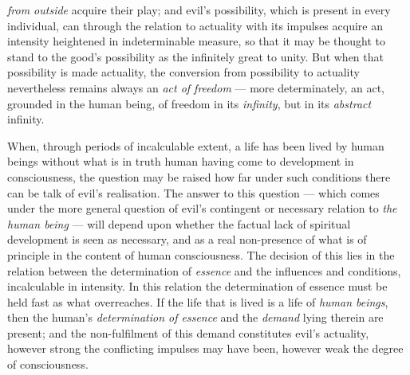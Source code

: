 \documentclass[12pt,a4paper]{book}
\begin{document}
\emph{from outside} acquire their play; and evil's possibility, which is present
in every individual, can through the relation to actuality with its impulses
acquire an intensity heightened in indeterminable measure, so that it may be
thought to stand to the good's possibility as the infinitely
great to unity. But when that possibility is made actuality, the conversion from
possibility to actuality nevertheless remains always an \emph{act of freedom} ---
more determinately, an act, grounded in the human being, of freedom in its
\emph{infinity}, but in its \emph{abstract} infinity.

When, through periods of incalculable extent, a life has been lived by human
beings without what is in truth human having come to development in
consciousness, the question may be raised how far under such conditions there
can be talk of evil's realisation. The answer to this question --- which comes
under the more general question of evil's contingent or necessary relation to
\emph{the human being} --- will depend upon whether the factual lack of
spiritual development is seen as necessary, and as a real non-presence of what
is of principle in the content of human consciousness. The decision of this lies
in the relation between the determination of \emph{essence} and the influences
and conditions, incalculable in intensity. In this relation the determination of
essence must be held fast as what overreaches. If the life that is lived is a
life of \emph{human beings}, then the human's \emph{determination of essence}
and the \emph{demand} lying therein are present; and the non-fulfilment of this
demand constitutes evil's actuality, however strong the conflicting impulses may
have been, however weak the degree of consciousness.
\end{document}
